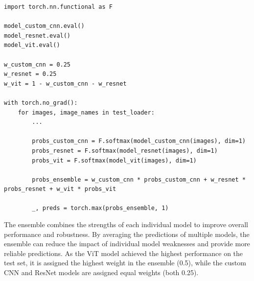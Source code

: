 \begin{minipage}{0.9\linewidth}\begin{lstlisting}[caption={Ensemble predictions using a weighted average.},label={lst:ensemble}]
import torch.nn.functional as F

model_custom_cnn.eval()
model_resnet.eval()
model_vit.eval()

w_custom_cnn = 0.25
w_resnet = 0.25
w_vit = 1 - w_custom_cnn - w_resnet

with torch.no_grad():
    for images, image_names in test_loader:
        ...

        probs_custom_cnn = F.softmax(model_custom_cnn(images), dim=1)
        probs_resnet = F.softmax(model_resnet(images), dim=1)
        probs_vit = F.softmax(model_vit(images), dim=1)

        probs_ensemble = w_custom_cnn * probs_custom_cnn + w_resnet * probs_resnet + w_vit * probs_vit

        _, preds = torch.max(probs_ensemble, 1)
\end{lstlisting}\end{minipage}

The ensemble combines the strengths of each individual model to improve overall performance and robustness. By averaging the predictions of multiple models, the ensemble can reduce the impact of individual model weaknesses and provide more reliable predictions. As the ViT model achieved the highest performance on the test set, it is assigned the highest weight in the ensemble (0.5), while the custom CNN and ResNet models are assigned equal weights (both 0.25).